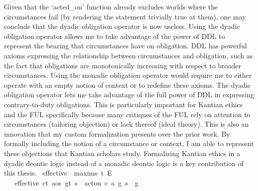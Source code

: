 \begin{isabellebody}
{Given that the `acted\_on' function already excludes worlds where the circumstances fail (by rendering 
the statement trivially true at them), one may conclude that the dyadic obligation operator is now useless. 
Using the dyadic obligation operator allows me to take advantage of the power of DDL to represent the bearing 
that circumstances have on obligation. DDL has powerful axioms expressing the relationship between circumstances 
and obligation, such as the fact that obligations are monotonically increasing with respect to broader 
circumstances. Using the monadic obligation operator would require me to either operate with an empty 
notion of context or to redefine these axioms. The dyadic obligation operator lets me take advantage of the full 
power of DDL in expressing contrary-to-duty obligations. This is particularly important for Kantian ethics 
and the FUL specifically because many critiques of the FUL rely on attention to circumstances (tailoring 
objection) or lack thereof (ideal theory). This is also an innovation that my custom formalization presents 
over the prior work. By formally including the notion of a circumstance or context, I am able to represent 
these objections that Kantian scholars study. Formalizing Kantian ethics in a dyadic deontic logic 
instead of a monadic deontic logic is a key contribution of this thesis.%
}\isanewline
\isanewline
{}\isamarkupfalse%
\ effective\ {\isacharcolon}{\isacharcolon}\ {\isachardoublequoteopen}maxim{\isasymRightarrow}s{\isasymRightarrow}\ t{\isachardoublequoteclose}\ {\isacharparenleft}{\isachardoublequoteopen}E\ {\isacharunderscore}\ {\isacharunderscore}{\isachardoublequoteclose}{\isacharparenright}\isanewline
\ \ \ {\isachardoublequoteopen}effective\ {\isacharparenleft}c{\isacharcolon}{\isacharcolon}t{\isacharcomma}\ a{\isacharcolon}{\isacharcolon}os{\isacharcomma}\ g{\isacharcolon}{\isacharcolon}t{\isacharparenright}\ s\ {\isacharequal}\ {\isacharparenleft}{\isacharparenleft}act{\isacharunderscore}on\ {\isacharparenleft}c{\isacharcomma}\ a{\isacharcomma}\ g{\isacharparenright}\ s{\isacharparenright}\ \isactrlbold {\isasymrightarrow}\ g{\isacharparenright}{\isachardoublequoteclose}\isanewline
%
\end{isabellebody}
